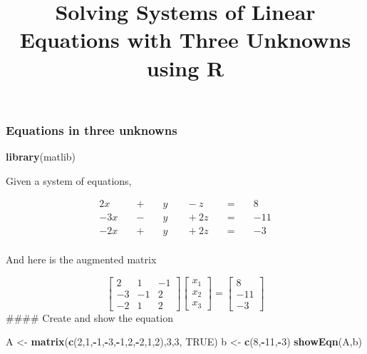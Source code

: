 \documentclass[
]{article}
\title{Solving Systems of Linear Equations with Three Unknowns using R}
\author{}
\date{\vspace{-2.5em}}
\newenvironment{Shaded}{\begin{snugshade}}{\end{snugshade}}
\newcommand{\DecValTok}[1]{\textcolor[rgb]{0.00,0.00,0.81}{#1}}
\newcommand{\KeywordTok}[1]{\textcolor[rgb]{0.13,0.29,0.53}{\textbf{#1}}}
\newcommand{\NormalTok}[1]{#1}
\newcommand{\OperatorTok}[1]{\textcolor[rgb]{0.81,0.36,0.00}{\textbf{#1}}}
\newcommand{\OtherTok}[1]{\textcolor[rgb]{0.56,0.35,0.01}{#1}}
\newcommand{\StringTok}[1]{\textcolor[rgb]{0.31,0.60,0.02}{#1}}
\begin{document}
\maketitle

\hypertarget{equations-in-three-unknowns}{%
\subsubsection{Equations in three
unknowns}\label{equations-in-three-unknowns}}

\begin{Shaded}
\begin{Highlighting}[]
\KeywordTok{library}\NormalTok{(matlib)}
\end{Highlighting}
\end{Shaded}

Given a system of equations,

\[
\begin{alignat*}{7}
2x &&\; + \;&& y  &&\; -z &&\; = \;&& 8  \\
-3x &&\; - \;&& y &&\; +2z  &&\; = \;&& -11 \\
-2x &&\; + \;&& y &&\; +2z &&\; = \;&& -3
\end{alignat*}
\]\\
And here is the augmented matrix

\[
\begin{bmatrix}
    2 & 1 & -1 \\
  -3 & -1 & 2 \\
  -2 & 1 & 2
  \end{bmatrix}
    \begin{bmatrix}
      x_{1} \\
    x_{2} \\
    x_{3}
\end{bmatrix}
    =
    \begin{bmatrix}
    8 \\
    -11\\
    -3
    \end{bmatrix}
\] \#\#\#\# Create and show the equation

\begin{Shaded}
\begin{Highlighting}[]
\NormalTok{A <-}\StringTok{ }\KeywordTok{matrix}\NormalTok{(}\KeywordTok{c}\NormalTok{(}\DecValTok{2}\NormalTok{,}\DecValTok{1}\NormalTok{,}\OperatorTok{-}\DecValTok{1}\NormalTok{,}\OperatorTok{-}\DecValTok{3}\NormalTok{,}\OperatorTok{-}\DecValTok{1}\NormalTok{,}\DecValTok{2}\NormalTok{,}\OperatorTok{-}\DecValTok{2}\NormalTok{,}\DecValTok{1}\NormalTok{,}\DecValTok{2}\NormalTok{),}\DecValTok{3}\NormalTok{,}\DecValTok{3}\NormalTok{, }\OtherTok{TRUE}\NormalTok{)}
\NormalTok{b <-}\StringTok{ }\KeywordTok{c}\NormalTok{(}\DecValTok{8}\NormalTok{,}\OperatorTok{-}\DecValTok{11}\NormalTok{,}\OperatorTok{-}\DecValTok{3}\NormalTok{)}
\KeywordTok{showEqn}\NormalTok{(A,b)}
\end{Highlighting}
\end{Shaded}
\end{document}
